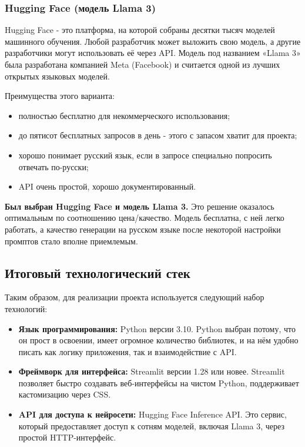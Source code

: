 \documentclass[14pt, a4paper]{extarticle}
\begin{document}
\begin{enumerate}
\subsubsection{Hugging Face (модель Llama 3)}

\noindent Hugging Face - это платформа, на которой собраны десятки тысяч моделей машинного обучения. Любой разработчик может выложить свою модель, а другие разработчики могут использовать её через API. Модель под названием «Llama 3» была разработана компанией Meta (Facebook) и считается одной из лучших открытых языковых моделей.

\medskip
\noindent Преимущества этого варианта:
\begin{itemize}
\item полностью бесплатно для некоммерческого использования;
\item до пятисот бесплатных запросов в день - этого с запасом хватит для проекта;
\item хорошо понимает русский язык, если в запросе специально попросить отвечать по-русски;
\item API очень простой, хорошо документированный.
\end{itemize}

\medskip
\noindent \textbf{Был выбран Hugging Face и модель Llama 3.} Это решение оказалось оптимальным по соотношению цена/качество. Модель бесплатна, с ней легко работать, а качество генерации на русском языке после некоторой настройки промптов стало вполне приемлемым.

\subsection{Итоговый технологический стек}

\noindent Таким образом, для реализации проекта используется следующий набор технологий:

\begin{itemize}
\item \textbf{Язык программирования:} Python версии 3.10. Python выбран потому, что он прост в освоении, имеет огромное количество библиотек, и на нём удобно писать как логику приложения, так и взаимодействие с API.

\item \textbf{Фреймворк для интерфейса:} Streamlit версии 1.28 или новее. Streamlit позволяет быстро создавать веб-интерфейсы на чистом Python, поддерживает кастомизацию через CSS.

\item \textbf{API для доступа к нейросети:} Hugging Face Inference API. Это сервис, который предоставляет доступ к сотням моделей, включая Llama 3, через простой HTTP-интерфейс.


\end{itemize}
\end{enumerate}
\end{document}

